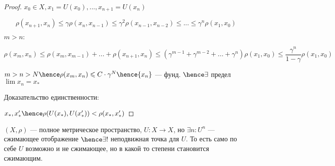 \begin{proof}
    $x_0 \in X, x_1 = U(x_0), ..., x_{n + 1} = U(x_n)$

    \[
        \rho(x_{n + 1}, x_n) \leqslant \gamma \rho (x_n, x_{n - 1}) \leqslant \gamma ^ 2 \rho (x_{n - 1}, x_{n - 2}) \leqslant ... \leqslant \gamma ^ n \rho(x_1, x_0)
    \]

    $m > n:$

    \[
        \rho(x_m, x_n) \leqslant \rho(x_m, x_{m - 1}) + ... + \rho(x_{n + 1}, x_n) \leqslant (\gamma ^ {m - 1} + \gamma^{m - 2} + ... + \gamma ^ n) \rho(x_1, x_0) \leqslant \frac{\gamma ^ n}{1 - \gamma} \rho(x_1, x_0)
    \]

    $m > n > N \hence \rho(x_m, x_n) \leqslant C \cdot \gamma ^ N \hence \{ x_n \}$ --- фунд. $\hence \exists$ предел $\lim x_n = x_*$

    Доказательство единственности:

    $x_*, x_*' \hence \rho(U(x_*), U(x_*')) < \rho(x_*, x_*')$
\end{proof}

\follow $(X, \rho)$ --- полное метрическое пространство, $U : X \to X$, но $\exists n : U ^ n$ --- сжимающее отображение $\hence \exists! $ неподвижная точка для $U$. То есть само по себе $U$ возможно и не сжимающее, но в какой то степени становится сжимающим.


